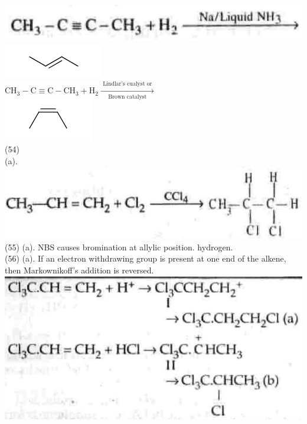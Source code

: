 \documentclass[10pt]{article}
\begin{document}
\includegraphics[max width=\textwidth, center]{2025_01_28_8470952b98110cec3aabg-243}\\
\includegraphics{smile-4c250d072ebde48e5368175c94875291a2dd9388}\\
$\mathrm{CH}_{3}-\mathrm{C} \equiv \mathrm{C}-\mathrm{CH}_{3}+\mathrm{H}_{2} \xrightarrow[\text { Brown catalyst }]{\text { Lindlar's cualyst or }}$\\
\includegraphics{smile-2a1a1e90489c27f6590b042ebd75d06cffea56c9}\\
(54)\\
(a).\\
\includegraphics[max width=\textwidth, center]{2025_01_28_8470952b98110cec3aabg-243(13)}\\
(55) (a). NBS causes bromination at allylic position. hydrogen.\\
(56) (a). If an electron withdrawing group is present at one end of the alkene, then Markownikoff's addition is reversed.\\
\includegraphics[max width=\textwidth, center]{2025_01_28_8470952b98110cec3aabg-243(10)}
\end{document}
